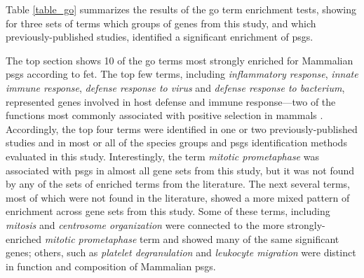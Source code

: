 Table \ref{table_go} summarizes the results of the \ac{go} term
enrichment tests, showing for three sets of terms which groups of
genes from this study, and which previously-published studies,
identified a significant enrichment of \acp{psg}.

The top section shows 10 of the \ac{go} terms most strongly enriched
for Mammalian \psgefive \acp{psg} according to \ac{fet}. The top few
terms, including \emph{inflammatory response}, \emph{innate immune
  response}, \emph{defense response to virus} and \emph{defense
  response to bacterium}, represented genes involved in host defense
and immune response---two of the functions most commonly associated
with positive selection in mammals \citep{Nielsen2005b}. Accordingly,
the top four terms were identified in one or two previously-published
studies and in most or all of the species groups and \acp{psg}
identification methods evaluated in this study. Interestingly, the term
\emph{mitotic prometaphase} was associated with \acp{psg} in almost
all gene sets from this study, but it was not found by any of the sets
of enriched terms from the literature. The next several terms, most of
which were not found in the literature, showed a more mixed pattern of
enrichment across gene sets from this study. Some of these terms,
including \emph{mitosis} and \emph{centrosome organization} were
connected to the more strongly-enriched \emph{mitotic prometaphase}
term and showed many of the same significant genes; others, such as
\emph{platelet degranulation} and \emph{leukocyte migration} were
distinct in function and composition of Mammalian \psgefive \acp{psg}.

